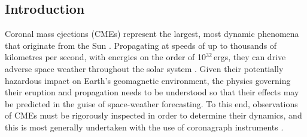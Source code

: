 \documentclass[referee,a4paper,12pt,traditabstract]{swsc}
\begin{document}
\begin{linenumbers}
   
   
   
   


   \maketitle

\section{Introduction}

Coronal mass ejections (CMEs) represent the largest, most dynamic phenomena that originate from the Sun \citep{2011LRSP....8....1C,2012LRSP....9....3W}. Propagating at speeds of up to thousands of kilometres per second, with energies on the order of 10$^{32}$\,ergs, they can drive adverse space weather throughout the solar system \citep{2005A&A...440..373H,2007LRSP....4....1P}. Given their potentially hazardous impact on Earth's geomagnetic environment, the physics governing their eruption and propagation needs to be understood so that their effects may be predicted in the guise of space-weather forecasting. To this end, observations of CMEs must be rigorously inspected in order to determine their dynamics, and this is most generally undertaken with the use of coronagraph instruments \citep[e.g.,][]{1975Koomen,1980ApJ...237L..99S,1980SoPh...65...91M,1985JGR....90..275I,1993JGR....9813177H, 1995SoPh..162..357B, 2008SSRv..136...67H}. 


\end{linenumbers}
\end{document}
